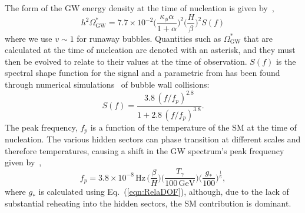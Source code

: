 \documentclass[nofootinbib,twocolumn,preprintnumbers]{revtex4-1}
\begin{document}
The form of the GW energy density at the time of nucleation is given by~\citep{Breitbach:2018ddu},
\begin{equation}\label{eqn::GWengdensity}
h^2\Omega_{\textrm{GW}}^* = 7.7\times 10^{-2} \bigg( \frac{\kappa_{\phi} \alpha}{1 + \alpha} \bigg)^2 \bigg( \frac{H}{\beta} \bigg)^2  S(f)
\end{equation}
where we use $v \sim 1$ for runaway bubbles. Quantities such as $\Omega_{\textrm{GW}}^*$ that are calculated at the time of nucleation are denoted with an asterisk, and they must then be evolved to relate to their values at the time of observation.  $S(f)$ is the spectral shape function for the signal and a parametric from has been found through numerical simulations~\cite{Huber_2008} of bubble wall collisions:
\begin{equation}\label{eqn::spectralshape}
S(f) = \frac{3.8 \,(f/f_p)^{2.8}}{1 + 2.8\,(f/f_p)^{3.8}}.
\end{equation}
The peak frequency, $f_{p}$ is a function of the temperature of the SM at the time of nucleation.  The various hidden sectors can phase transition at different scales and therefore temperatures, causing a shift in the GW spectrum's peak frequency given by~\cite{Huber_2008},
%
\begin{equation}\label{eqn:peakFrequency}
f_{p} = 3.8 \times 10^{-8} \, \textrm{Hz}\, \bigg( \frac{\beta}{H}\bigg)\bigg(\frac{T_{\gamma}}{100 \, \textrm{GeV}}\bigg)\bigg(\frac{g_{*}}{100}\bigg)^{\frac{1}{6}},
\end{equation}
%
where $g_*$  is calculated using Eq.~(\ref{eqn:RelaDOF}), although, due to the lack of substantial reheating into the hidden sectors, the SM contribution is dominant. 
\end{document}
